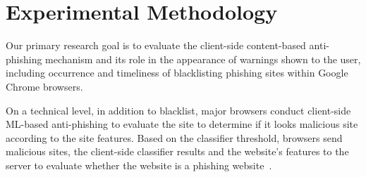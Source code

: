 \documentclass[letterpaper,twocolumn,10pt]{article}
\begin{document}
 
 
\section{Experimental Methodology}













Our primary research goal is to evaluate the client-side content-based anti-phishing mechanism and its role in the appearance of warnings shown to the user, including occurrence and timeliness of blacklisting phishing sites within Google Chrome browsers.

On a technical level, in addition to blacklist, major browsers conduct client-side ML-based anti-phishing to evaluate the site to determine if it looks malicious site according to the site features. Based on the classifier threshold, browsers send malicious sites, the client-side classifier results and the website's features to the server to evaluate whether the website is a phishing website~\cite{google-online-security-blog-2019}.
\end{document}
